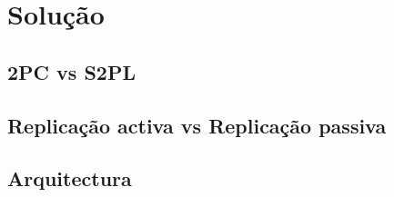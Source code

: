 \section{Solução}

\subsection{2PC vs S2PL}

\subsection{Replicação activa vs Replicação passiva}

\subsection{Arquitectura}